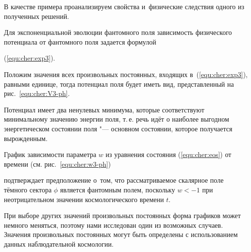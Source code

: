 \smallskip




В качестве примера проанализируем  свойства и~физические следствия одного из полученных решений.

Для экспоненциальной эволюции фантомного поля зависимость физического потенциала от фантомного поля задается формулой

(\ref{equ:cher:exp3}).

Положим значения всех произвольных постоянных, входящих в~(\ref{equ:cher:exp3}), равными единице, тогда потенциал поля будет иметь вид, представленный на рис.~\ref{equ:cher:V3-ph}.









Потенциал имеет два ненулевых минимума, которые соответствуют минимальному значению энергии поля, т.\,е. речь идёт о наиболее выгодном энергетическом состоянии поля "--- основном состоянии, которое получается вырожденным.



График зависимости параметра $ w $ из уравнения состояния (\ref{equ:cher:eos}) от времени (см. рис.~\ref{equ:cher:w3-ph})

подтверждает предположение о~том, что рассматриваемое скалярное поле тёмного сектора $ \phi $ является фантомным полем, поскольку $ w < -1 $ при неотрицательном значении космологического времени $t$.









При выборе других значений произвольных постоянных форма графиков может немного меняться, поэтому нами исследован один из возможных случаев. Значения произвольных постоянных могут быть определены с использованием данных наблюдательной космологии.



